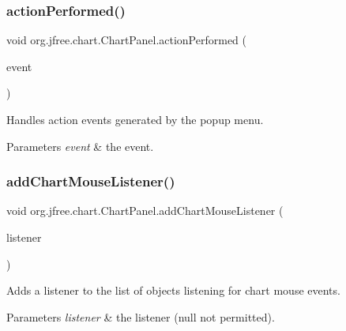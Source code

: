 \subsubsection{\texorpdfstring{action\+Performed()}{actionPerformed()}}
{\footnotesize\ttfamily void org.\+jfree.\+chart.\+Chart\+Panel.\+action\+Performed (\begin{DoxyParamCaption}\item[{Action\+Event}]{event }\end{DoxyParamCaption})}

Handles action events generated by the popup menu.


\begin{DoxyParams}{Parameters}
{\em event} & the event. \\
\hline
\end{DoxyParams}
\mbox{\label{classorg_1_1jfree_1_1chart_1_1_chart_panel_ac52adbd22476ece66a369804778b0a3d}} 
\subsubsection{\texorpdfstring{add\+Chart\+Mouse\+Listener()}{addChartMouseListener()}}
{\footnotesize\ttfamily void org.\+jfree.\+chart.\+Chart\+Panel.\+add\+Chart\+Mouse\+Listener (\begin{DoxyParamCaption}\item[{\mbox{\hyperlink{interfaceorg_1_1jfree_1_1chart_1_1_chart_mouse_listener}{Chart\+Mouse\+Listener}}}]{listener }\end{DoxyParamCaption})}

Adds a listener to the list of objects listening for chart mouse events.


\begin{DoxyParams}{Parameters}
{\em listener} & the listener ({\ttfamily null} not permitted). \\
\hline
\end{DoxyParams}
\mbox{\label{classorg_1_1jfree_1_1chart_1_1_chart_panel_aca2b01b8b0e52da6587509a006baf882}} 
